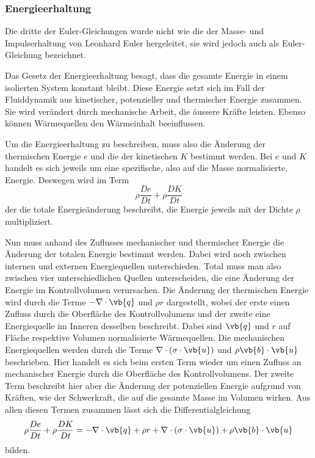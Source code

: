\subsubsection{Energieerhaltung}
Die dritte der Euler-Gleichungen wurde nicht wie die der Masse- und Impulserhaltung von Leonhard Euler hergeleitet, sie wird jedoch auch als Euler-Gleichung bezeichnet.

Das Gesetz der Energieerhaltung besagt, dass die gesamte Energie in einem isolierten System konstant bleibt.
Diese Energie setzt sich im Fall der Fluiddynamik aus kinetischer, potenzieller und thermischer Energie zusammen.
Sie wird verändert durch mechanische Arbeit, die äussere Kräfte leisten. Ebenso können Wärmequellen den Wärmeinhalt beeinflussen.

Um die Energieerhaltung zu beschreiben, muss also die Änderung der thermischen Energie $e$ und die der kinetischen $K$ bestimmt werden.
Bei $e$ und  $K$ handelt es sich jeweils um eine spezifische, also auf die Masse normalisierte, Energie.
Deswegen wird im Term 
\[\rho \frac{De}{Dt}+  \rho \frac{DK}{Dt}
\]
der die totale Energieänderung beschreibt, die Energie jeweils mit der Dichte $\rho$ multipliziert.

Nun muss anhand des Zuflusses mechanischer und thermischer Energie die Änderung der totalen Energie bestimmt werden.
Dabei wird noch zwischen internen und externen Energiequellen unterschieden.
Total muss man also zwischen vier unterschiedlichen Quellen unterscheiden, die eine Änderung der Energie im Kontrollvolumen verursachen.
Die Änderung der thermischen Energie wird durch die Terme  $- \nabla \cdot \vb{q}$ und  $\rho r$ dargestellt, wobei der erste einen Zufluss durch die Oberfläche des Kontrollvolumens und der zweite eine Energiequelle im Inneren desselben beschreibt.
Dabei sind $\vb{q}$ und $r$ auf Fläche respektive Volumen normalisierte Wärmequellen.
Die mechanischen Energiequellen werden durch die Terme $\nabla \cdot (\sigma \cdot \vb{u})$ und $\rho \vb{b} \cdot \vb{u}$ beschrieben.
Hier handelt es sich beim ersten Term wieder um einen Zufluss an mechanischer Energie durch die Oberfläche des Kontrollvolumens.  Der zweite Term beschreibt hier aber die Änderung der potenziellen Energie aufgrund von Kräften, wie der Schwerkraft, die auf die gesamte Masse im Volumen wirken.
Aus allen diesen Termen zusammen lässt sich die Differentialgleichung
\begin{equation}
\label{openfoam:euler3}
\rho \frac{De}{Dt}+  \rho \frac{DK}{Dt}
=
- \nabla \cdot \vb{q} + \rho r + \nabla \cdot (\sigma \cdot \vb{u}) + \rho \vb{b} \cdot \vb{u} 
\end{equation} 
bilden.

